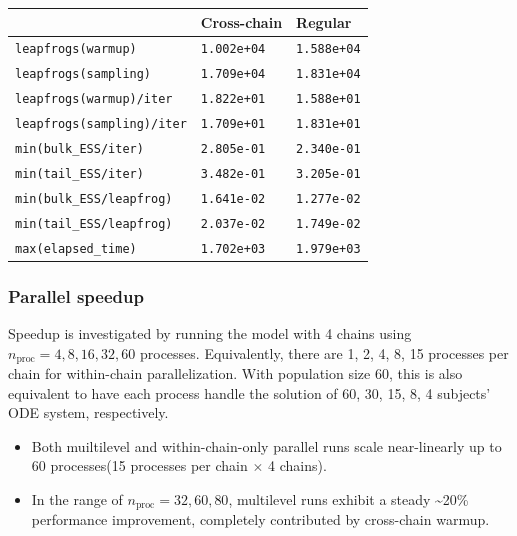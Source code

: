 \documentclass[landscape,a0paper,fontscale=0.45]{baposter} %
\begin{document}
\begin{poster}
{\begin{multicols}{2}
\begin{center}
\footnotesize
\begin{tabular}{l l l}
\hline
 & Cross-chain & Regular \\
\hline
 \texttt{leapfrogs(warmup)}        &  \texttt{1.002e+04}  & \texttt{1.588e+04}\\
 \texttt{leapfrogs(sampling)}      &  \texttt{1.709e+04}  & \texttt{1.831e+04}\\
 \texttt{leapfrogs(warmup)/iter}   &  \texttt{1.822e+01}  & \texttt{1.588e+01}\\
 \texttt{leapfrogs(sampling)/iter} &  \texttt{1.709e+01}  & \texttt{1.831e+01}\\
 \texttt{min(bulk\_ESS/iter)}       & \texttt{2.805e-01}  & \texttt{2.340e-01}\\
 \texttt{min(tail\_ESS/iter)}       & \texttt{3.482e-01}  & \texttt{3.205e-01}\\
 \texttt{min(bulk\_ESS/leapfrog)}   & \texttt{1.641e-02}  & \texttt{1.277e-02}\\
 \texttt{min(tail\_ESS/leapfrog)}   & \texttt{2.037e-02}  & \texttt{1.749e-02}\\
 \texttt{max(elapsed\_time)}        & \texttt{1.702e+03}  & \texttt{1.979e+03}\\
\hline
\end{tabular}
\label{tab:ttpn}
\end{center}

\subsubsection*{Parallel speedup}
Speedup is investigated by running the model
with 4 chains using \(n_{\text{proc}} = 4, 8, 16, 32, 60\)
processes. Equivalently, there are
1, 2, 4, 8, 15 processes per chain for within-chain parallelization.
With population size 60, this is also equivalent to have each process handle the solution of
60, 30, 15, 8, 4 subjects' ODE system, respectively.
\begin{itemize}
\item Both muiltilevel and within-chain-only parallel runs scale near-linearly up to 60
  processes(15 processes per chain \(\times\) 4 chains).
\item In the range of \(n_{\text{proc}}=32, 60, 80\), multilevel runs
  exhibit a steady \textasciitilde 20\% performance improvement, completely
  contributed by cross-chain warmup.
\end{itemize}


\end{multicols}}
\end{poster}
\end{document}

